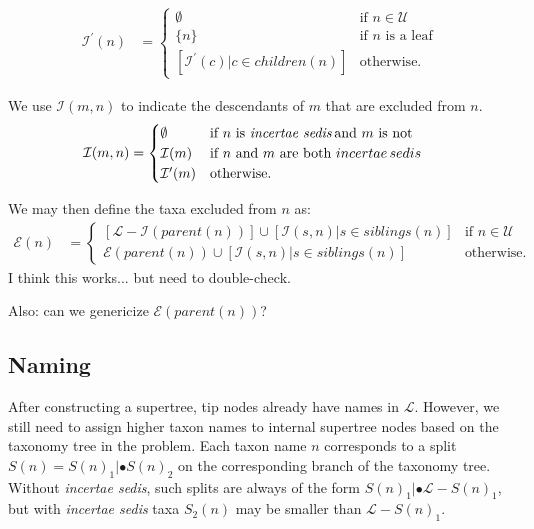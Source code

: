 \documentclass[english]{article}
\begin{document}
\begin{align*} \mathcal{I^{\prime}}(n) & =\begin{cases} \emptyset &
\text{if }n\in\mathcal{U}\\ \{n\} & \text{if }n\text{ is a leaf}\\{}
[\mathcal{I}^{\prime}(c)|c\in children(n)] & \text{otherwise.}
\end{cases} \end{align*}

We use $\mathcal{I}(m,n)$ to indicate the descendants of $m$ that are
excluded from $n$.
\begin{align*} \mathcal{I}(m,n) & =\begin{cases}
\emptyset & \text{if }n\text{ is \emph{incertae sedis}\,and }m\text{
is not}\\ \mathcal{I}(m) & \text{if }n\text{ and }m\text{ are both
}incertae\,sedis\\ \mathcal{I}^{\prime}(m) & \text{otherwise.}
\end{cases} \end{align*}

We may then define the taxa excluded from $n$ as:
\begin{align*}
\mathcal{E}(n) & =\begin{cases}
\left[\mathcal{L}-\mathcal{I}(parent(n))\right]\cup[\mathcal{I}(s,n)|s\in siblings(n)] & \text{if }n\in\mathcal{U}\\
\mathcal{E}(parent(n))\cup[\mathcal{I}(s,n)|s\in siblings(n)] & \text{otherwise.}
\end{cases}
\end{align*}
I think this works...
but
need to double-check.

Also: can we genericize $\mathcal{E}(parent(n))$?

\subsection{Naming }

After constructing a supertree, tip nodes already have names in
\emph{$\mathcal{L}$}.
However, we still need to assign higher taxon
names to internal supertree nodes based on the taxonomy tree in the
problem.
Each taxon name $n$ corresponds to a split
$S(n)=S(n)_{1}|\bullet S(n)_{2}$ on the corresponding branch of the
taxonomy tree.
Without \emph{incertae sedis}, such splits are always
of the form $S(n)_{1}|\bullet\mathcal{L}-S(n)_{1}$, but with
\emph{incertae sedis} taxa $S_{2}(n)$ may be smaller than
$\mathcal{L}-S(n)_{1}$.
\end{document}

